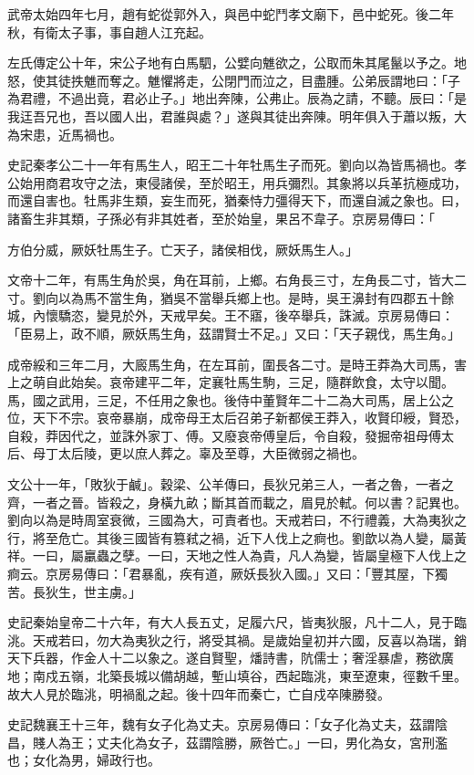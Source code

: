 \begin{pinyinscope}
武帝太始四年七月，趙有蛇從郭外入，與邑中蛇鬥孝文廟下，邑中蛇死。後二年秋，有衛太子事，事自趙人江充起。

左氏傳定公十年，宋公子地有白馬駟，公嬖向魋欲之，公取而朱其尾鬣以予之。地怒，使其徒抶魋而奪之。魋懼將走，公閉門而泣之，目盡腫。公弟辰謂地曰：「子為君禮，不過出竟，君必止子。」地出奔陳，公弗止。辰為之請，不聽。辰曰：「是我迋吾兄也，吾以國人出，君誰與處？」遂與其徒出奔陳。明年俱入于蕭以叛，大為宋患，近馬禍也。

史記秦孝公二十一年有馬生人，昭王二十年牡馬生子而死。劉向以為皆馬禍也。孝公始用商君攻守之法，東侵諸侯，至於昭王，用兵彌烈。其象將以兵革抗極成功，而還自害也。牡馬非生類，妄生而死，猶秦恃力彊得天下，而還自滅之象也。曰，諸畜生非其類，子孫必有非其姓者，至於始皇，果呂不韋子。京房易傳曰：「

方伯分威，厥妖牡馬生子。亡天子，諸侯相伐，厥妖馬生人。」

文帝十二年，有馬生角於吳，角在耳前，上鄉。右角長三寸，左角長二寸，皆大二寸。劉向以為馬不當生角，猶吳不當舉兵鄉上也。是時，吳王濞封有四郡五十餘城，內懷驕恣，變見於外，天戒早矣。王不寤，後卒舉兵，誅滅。京房易傳曰：「臣易上，政不順，厥妖馬生角，茲謂賢士不足。」又曰：「天子親伐，馬生角。」

成帝綏和三年二月，大廄馬生角，在左耳前，圍長各二寸。是時王莽為大司馬，害上之萌自此始矣。哀帝建平二年，定襄牡馬生駒，三足，隨群飲食，太守以聞。馬，國之武用，三足，不任用之象也。後侍中董賢年二十二為大司馬，居上公之位，天下不宗。哀帝暴崩，成帝母王太后召弟子新都侯王莽入，收賢印綬，賢恐，自殺，莽因代之，並誅外家丁、傅。又廢哀帝傅皇后，令自殺，發掘帝祖母傅太后、母丁太后陵，更以庶人葬之。辜及至尊，大臣微弱之禍也。

文公十一年，「敗狄于鹹」。穀梁、公羊傳曰，長狄兄弟三人，一者之魯，一者之齊，一者之晉。皆殺之，身橫九畝；斷其首而載之，眉見於軾。何以書？記異也。劉向以為是時周室衰微，三國為大，可責者也。天戒若曰，不行禮義，大為夷狄之行，將至危亡。其後三國皆有篡弒之禍，近下人伐上之痾也。劉歆以為人變，屬黃祥。一曰，屬臝蟲之孽。一曰，天地之性人為貴，凡人為變，皆屬皇極下人伐上之痾云。京房易傳曰：「君暴亂，疾有道，厥妖長狄入國。」又曰：「豐其屋，下獨苦。長狄生，世主虜。」

史記秦始皇帝二十六年，有大人長五丈，足履六尺，皆夷狄服，凡十二人，見于臨洮。天戒若曰，勿大為夷狄之行，將受其禍。是歲始皇初并六國，反喜以為瑞，銷天下兵器，作金人十二以象之。遂自賢聖，燔詩書，阬儒士；奢淫暴虐，務欲廣地；南戍五嶺，北築長城以備胡越，塹山填谷，西起臨洮，東至遼東，徑數千里。故大人見於臨洮，明禍亂之起。後十四年而秦亡，亡自戍卒陳勝發。

史記魏襄王十三年，魏有女子化為丈夫。京房易傳曰：「女子化為丈夫，茲謂陰昌，賤人為王；丈夫化為女子，茲謂陰勝，厥咎亡。」一曰，男化為女，宮刑濫也；女化為男，婦政行也。


\end{pinyinscope}
